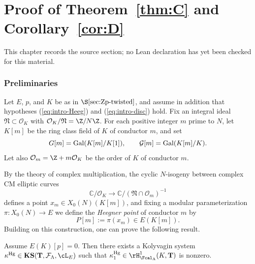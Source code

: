 \chapter{Proof of Theorem~\ref{thm:C} and Corollary~\ref{cor:D}}
\label{anticyclotomic-iwasawa-rational-elliptic-eisenstein-chapter-05}

\begin{remark}
\label{anticyclotomic-iwasawa-rational-elliptic-eisenstein-chapter-05-source}
This chapter records the source section; no Lean declaration has yet been checked for this material.
\notready
\end{remark}

\label{sec:CD}

\subsection{Preliminaries}
\label{subsec:HPKS}

Let $E$, $p$, and $K$ be as in $\S\ref{sec:Zp-twisted}$, and assume in addition that hypotheses (\ref{eq:intro-Heeg}) and (\ref{eq:intro-disc}) hold. Fix an integral ideal $\mathfrak{N}\subset\mathcal{O}_K$ with $\mathcal{O}_K/\mathfrak{N}=\Z/N\Z$. For each positive integer $m$ prime to $N$, let $K[m]$ be the ring class field of $K$ of conductor $m$, and set
\[
G[m]={\rm Gal}(K[m]/K[1]),\quad\quad\mathcal{G}[m]={\rm Gal}(K[m]/K).
\]
Let also $\mathcal{O}_m=\Z+m\mathcal{O}_K$ be the order of $K$ of conductor $m$.

By the theory of complex multiplication, the cyclic $N$-isogeny between complex CM elliptic curves
\[
\mathbb{C}/\mathcal{O}_K\rightarrow\mathbb{C}/(\mathfrak{N}\cap\mathcal{O}_m)^{-1}
\]
defines a point $x_m\in X_0(N)(K[m])$, and fixing a modular parameterization $\pi:X_0(N)\rightarrow E$ we define the \emph{Heegner point} of conductor $m$ by
\[
P[m]:=\pi(x_m)\in E(K[m]).
\]
Building on this construction, one can prove the following result.


\begin{theorem}
\notready%
\label{thm:howard-HPKS}
Assume $E(K)[p]=0$. Then there exists a Kolyvagin system $\kappa^{\rm Hg}\in\mathbf{KS}(\mathbf{T},\mathcal{F}_\Lambda,\cL_E)$ such that $\kappa_1^{\rm Hg}\in\rH^1_{\Fcal_\Lambda}(K,\mathbf{T})$ is nonzero.
\end{theorem}

